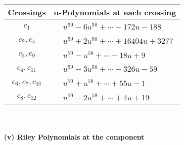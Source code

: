 \documentclass[1p]{elsarticle_modified}
\theoremstyle{definition}
\begin{document}
\begin{tabular}{m{50pt}|m{274pt}}
Crossings & \hspace{64pt}u-Polynomials at each crossing \\
\hline $$\begin{aligned}c_{1}\end{aligned}$$&$\begin{aligned}
&u^{59}-6 u^{58}+\cdots-172 u-188
\end{aligned}$\\
\hline $$\begin{aligned}c_{2},c_{5}\end{aligned}$$&$\begin{aligned}
&u^{59}+2 u^{58}+\cdots+16404 u+3277
\end{aligned}$\\
\hline $$\begin{aligned}c_{3},c_{9}\end{aligned}$$&$\begin{aligned}
&u^{59}- u^{58}+\cdots-18 u+9
\end{aligned}$\\
\hline $$\begin{aligned}c_{4},c_{11}\end{aligned}$$&$\begin{aligned}
&u^{59}-3 u^{58}+\cdots-326 u-59
\end{aligned}$\\
\hline $$\begin{aligned}c_{6},c_{7},c_{10}\end{aligned}$$&$\begin{aligned}
&u^{59}+u^{58}+\cdots+55 u-1
\end{aligned}$\\
\hline $$\begin{aligned}c_{8},c_{12}\end{aligned}$$&$\begin{aligned}
&u^{59}-2 u^{58}+\cdots+4 u+19
\end{aligned}$\\
\hline
\end{tabular}\\~\\
\newpage\renewcommand{\arraystretch}{1}
\flushleft \textbf{(v) Riley Polynomials at the component}\newline \\
\end{document}

